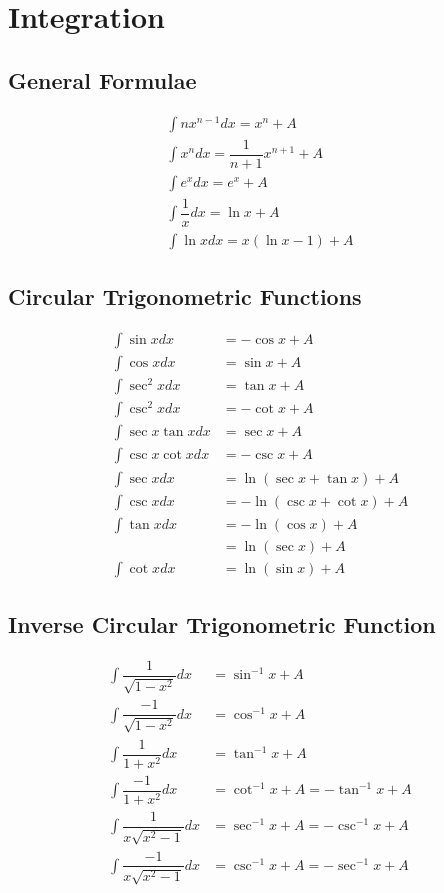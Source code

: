 \documentclass[../main.tex]{subfile}
\begin{document}
\chapter{Integration}
\section{General Formulae}
\begin{align}
    \int nx^{n-1} dx = x^n + A\\
    \int x^n dx = \dfrac{1}{n + 1}x^{n + 1} + A\\
    \int e^x dx = e^x+A\\
    \int \dfrac{1}{x} dx = \ln x + A\\
    \int \ln x dx = x(\ln x - 1) + A
\end{align}

\section{Circular Trigonometric Functions}
\begin{align}
    \int \sin x dx & = -\cos x + A\\
    \int \cos x dx & = \sin x + A\\
    \int \sec^2 x dx & = \tan x + A\\
    \int \csc^2 x dx & = -\cot x + A\\
    \int \sec x \tan x dx & = \sec x + A\\
    \int \csc x \cot x dx & = -\csc x + A\\
    \int \sec x dx & = \ln (\sec x + \tan x) + A\\
    \int \csc x dx & = -\ln (\csc x + \cot x)+A\\
    \int \tan x dx & = -\ln (\cos x) + A \\
                   & = \ln(\sec x) + A\\
    \int \cot x dx & = \ln (\sin x) + A
\end{align}

\section{Inverse Circular Trigonometric Function}
\begin{align}
    \int \dfrac{1}{\sqrt{1 - x^2}} dx & = \sin^{-1} x + A\\
    \int \dfrac{-1}{\sqrt{1 - x^2}} dx & = \cos^{-1} x + A\\
    \int \dfrac{1}{1 + x^2} dx & = \tan^{-1} x + A\\
    \int \dfrac{-1}{1 + x^2} dx & = \cot^{-1} x + A = - \tan^{-1} x + A\\
    \int \dfrac{1}{x\sqrt{x^2 - 1}} dx & = \sec^{-1} x + A = -\csc^{-1} x + A\\
    \int \dfrac{-1}{x\sqrt{x^2 - 1}} dx & = \csc^{-1} x + A = -\sec^{-1} x + A
\end{align}
\end{document}
